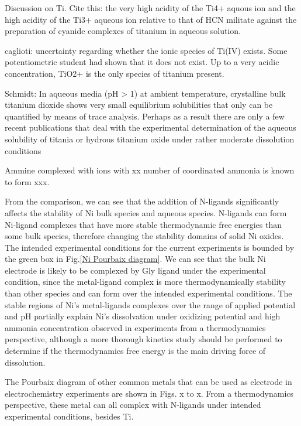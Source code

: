 \documentclass[journal=jacsat,manuscript=article]{achemso}
\begin{document}
Discussion on Ti. 
Cite this: the very high acidity of the Ti4+ aquous ion and the high acidity of the Ti3+ aqueous ion relative to that of HCN militate against the preparation of cyanide complexes of titanium in aqueous solution\cite{Nicholls1980ComplexTitanium}.

caglioti: uncertainty regarding whether the ionic species of Ti(IV) exists. Some potentiometric student had shown that it does not exist. Up to a very acidic concentration, TiO2+ is the only species of titanium present. 

Schmidt: In aqueous media (pH > 1) at ambient temperature, crystalline bulk titanium dioxide
shows very small equilibrium solubilities that only can be quantified by means of trace
analysis. Perhaps as a result there are only a few recent publications that deal with the experimental determination of the aqueous solubility of titania or hydrous titanium oxide under
rather moderate dissolution conditions

Ammine complexed with ions with xx number of coordinated ammonia is known to form xxx. 

From the comparison, we can see that the addition of N-ligands significantly affects the stability of Ni bulk species and aqueous species. N-ligands can form Ni-ligand complexes that have more stable thermodynamic free energies than some bulk species, therefore changing the stability domains of solid Ni oxides. The intended experimental conditions for the current experiments is bounded by the green box in Fig.\ref{Ni Pourbaix diagram}. We can see that the bulk Ni electrode is likely to be complexed by Gly ligand under the experimental condition, since the metal-ligand complex is more thermodynamically stability than other species and can form over the intended experimental conditions. The stable regions of Ni's metal-ligands complexes over the range of applied potential and pH partially explain Ni's dissolvation under oxidizing potential and high ammonia concentration observed in experiments from a thermodynamics perspective, although a more thorough kinetics study should be performed to determine if the thermodynamics free energy is the main driving force of dissolution. 

The Pourbaix diagram of other common metals that can be used as electrode in electrochemistry experiments are shown in Figs. x to x. From a thermodynamics perspective, these metal can all complex with N-ligands under intended experimental conditions, besides Ti. 
\end{document}
